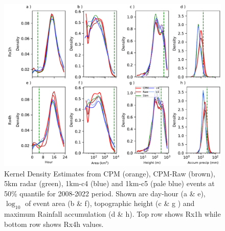 \documentclass[11pt,a4paper]{article}
\begin{document}
\begin{figure}
	\centering
	\includegraphics[width=\linewidth]{kde_smooth_events}
	\caption{Kernel Density Estimates from  CPM (orange), CPM-Raw (brown), 5km radar (green), 1km-c4 (blue) and 1km-c5 (pale blue) events at 50\% quantile for 2008-2022 period. Shown are day-hour (a \& e),$\log_{10}$ of event area (b \& f),  topographic height (c \& g ) and maximum Rainfall accumulation (d \& h). Top row shows Rx1h while bottom row shows Rx4h values.}
\end{figure}




    
\end{document}
